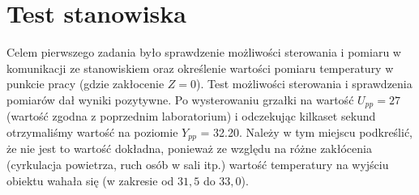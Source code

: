 \chapter{Test stanowiska}
Celem pierwszego zadania było sprawdzenie możliwości sterowania i pomiaru w komunikacji
ze stanowiskiem oraz określenie wartości pomiaru temperatury w punkcie pracy
(gdzie zakłocenie $Z = 0$).
Test możliwości sterowania i sprawdzenia pomiarów dał wyniki pozytywne.
Po wysterowaniu grzałki na wartość $U_{pp} = 27$ (wartość zgodna z poprzednim laboratorium) i odczekując
kilkaset sekund otrzymaliśmy wartość na poziomie $Y_{pp}$ = 32.20. Należy w tym
miejscu podkreślić, że nie jest to wartość dokładna, ponieważ ze względu na różne
zakłócenia (cyrkulacja powietrza, ruch osób w sali itp.) wartość temperatury na
wyjściu obiektu wahała się (w zakresie od $31,5$ do $33,0$).
